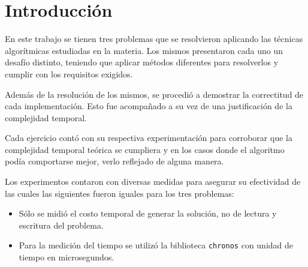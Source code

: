\section{Introducción}

En este trabajo se tienen tres problemas que se resolvieron aplicando las
técnicas algorítmicas estudiadas en la materia. Los mismos presentaron cada uno un desafío
distinto, teniendo que aplicar métodos diferentes para resolverlos y cumplir
con los requisitos exigidos.

Además de la resolución de los mismos, se procedió a demostrar la correctitud de
cada implementación. Esto fue acompañado a su vez de una justificación de la
complejidad temporal.

Cada ejercicio contó con su respectiva experimentación para corroborar que la
complejidad temporal teórica se cumpliera y en los casos donde el algoritmo
podía comportarse mejor, verlo reflejado de alguna manera.

Los experimentos contaron con diversas medidas para asegurar su efectividad de
las cuales las siguientes fueron iguales para los tres problemas:
\begin{itemize}
	\item{Sólo se midió el costo temporal de generar la solución, no
			de lectura y escritura del problema.}
	\item{Para la medición del tiempo se utilizó la biblioteca \texttt{chronos}
			con unidad de tiempo en microsegundos.}
\end{itemize}
